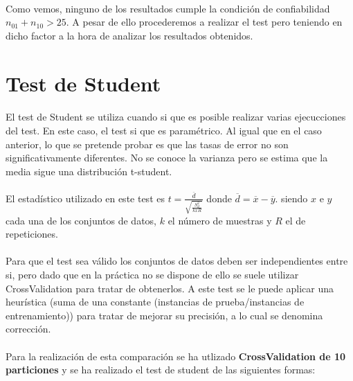 \documentclass[10pt, a4paper,spanish]{article}
\begin{document}
		\paragraph{}
		Como vemos, ninguno de los resultados cumple la condición de confiabilidad $n_{01} + n_{10} > 25$. A pesar de ello procederemos a realizar el test pero teniendo en dicho factor a la hora de analizar los resultados obtenidos.


	\section{Test de Student}

		\paragraph{}
		El test de Student se utiliza cuando si que es posible realizar varias ejecucciones del test. En este caso, el test si que es paramétrico. Al igual que en el caso anterior, lo que se pretende probar es que las tasas de error no son significativamente diferentes. No se conoce la varianza pero se estima que la media sigue una distribución t-student.

		\paragraph{}
		El estadístico utilizado en este test es $t = \frac{\overline{d}}{\sqrt{\frac{S^2_d}{k x R}}}$ donde $\overline{d} = \overline{x} - \overline{y}$. siendo $x$ e $y$ cada una de los conjuntos de datos, $k$ el número de muestras y $R$ el de repeticiones.

		\paragraph{}
		Para que el test sea válido los conjuntos de datos deben ser independientes entre si, pero dado que en la práctica no se dispone de ello se suele utilizar CrossValidation para tratar de obtenerlos. A este test se le puede aplicar una heurística (suma de una constante (instancias de prueba/instancias de entrenamiento)) para tratar de mejorar su precisión, a lo cual se denomina corrección.

		\paragraph{}
		Para la realización de esta comparación se ha utlizado \textbf{CrossValidation de 10 particiones} y se ha realizado el test de student de las siguientes formas:
\end{document}
